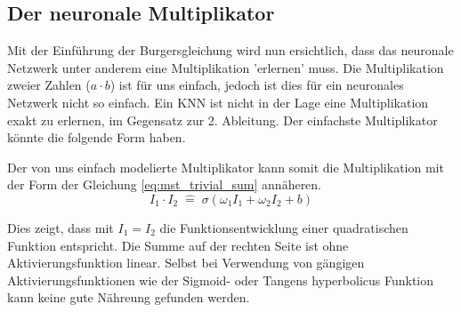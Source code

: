 \subsection{Der neuronale Multiplikator}
Mit der Einführung der Burgersgleichung wird nun ersichtlich, dass das neuronale Netzwerk unter anderem eine Multiplikation 'erlernen' muss. Die Multiplikation zweier Zahlen ($a \cdot b$) ist für uns einfach, jedoch ist dies für ein neuronales Netzwerk nicht so einfach. Ein KNN ist nicht in der Lage eine Multiplikation exakt zu erlernen, im Gegensatz zur 2. Ableitung. Der einfachste Multiplikator könnte die folgende Form haben.
\begin{center}
\end{center}
Der von uns einfach modelierte Multiplikator kann somit die Multiplikation mit der Form der Gleichung \eqref{eq:mst_trivial_sum} annäheren. 
\begin{equation}
I_{1} \cdot I_{2} \; \hat{=} \; \sigma \left( \omega_{1} I_1 + \omega_{2} I_2 + b \right) 
\label{eq:mst_traivial_sum}
\end{equation}

Dies zeigt, dass mit $I_1 = I_2$ die Funktionsentwicklung einer quadratischen Funktion entspricht. Die Summe auf der rechten Seite ist ohne Aktivierungsfunktion linear. Selbst bei Verwendung von gängigen Aktivierungsfunktionen wie der Sigmoid- oder Tangens hyperbolicus Funktion kann keine gute Nähreung gefunden werden. 

